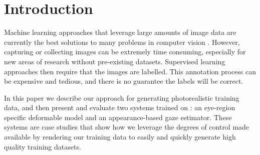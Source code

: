 
\section{Introduction}

Machine learning approaches that leverage large amounts of image data are currently the best solutions to many problems in computer vision . However, capturing or collecting images can be extremely time consuming, especially for new areas of research without pre-existing datasets. Supervised learning approaches then require that the images are labelled. This annotation process can be expensive and tedious, and there is no guarantee the labels will be correct.

In this paper we describe our approach for generating photorealistic training data, and then present and evaluate two systems trained on \dataset: an eye-region specific deformable model and an appearance-based gaze estimator. These systems are case studies that show how we leverage the degrees of control made available by rendering our training data to easily and quickly generate high quality training datasets.

